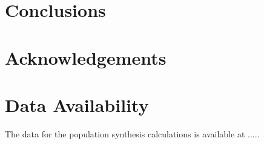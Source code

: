 \documentclass[fleqn,usenatbib,letters]{mnras}
\begin{document}
\section{Conclusions}\label{sec:conclusions}

\section*{Acknowledgements}

\section*{Data Availability}

The data for the population synthesis calculations is available at ..... 







\appendix


\bsp	%
\label{lastpage}
\end{document}
